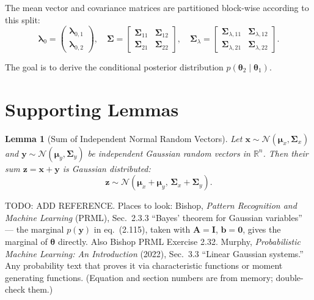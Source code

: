 \documentclass{article}
\newtheorem{lemma}{Lemma}
\begin{document}
The mean vector and covariance matrices are partitioned block-wise according to this split:
\begin{equation}
    \boldsymbol{\lambda}_0 = \begin{pmatrix} \boldsymbol{\lambda}_{0,1} \\ \boldsymbol{\lambda}_{0,2} \end{pmatrix}, \quad
    \boldsymbol{\Sigma} = \begin{bmatrix} \boldsymbol{\Sigma}_{11} & \boldsymbol{\Sigma}_{12} \\ \boldsymbol{\Sigma}_{21} & \boldsymbol{\Sigma}_{22} \end{bmatrix}, \quad
    \boldsymbol{\Sigma}_\lambda = \begin{bmatrix} \boldsymbol{\Sigma}_{\lambda,11} & \boldsymbol{\Sigma}_{\lambda,12} \\ \boldsymbol{\Sigma}_{\lambda,21} & \boldsymbol{\Sigma}_{\lambda,22} \end{bmatrix}.
\end{equation}

The goal is to derive the conditional posterior distribution $p(\boldsymbol{\theta}_2 \mid \boldsymbol{\theta}_1)$.


\section*{Supporting Lemmas}

\begin{lemma}[Sum of Independent Normal Random Vectors]
\label{lem:gaussian_sum}
Let $\mathbf{x} \sim \mathcal{N}(\boldsymbol{\mu}_x, \boldsymbol{\Sigma}_x)$ and $\mathbf{y} \sim \mathcal{N}(\boldsymbol{\mu}_y, \boldsymbol{\Sigma}_y)$ be independent Gaussian random vectors in $\mathbb{R}^n$. Then their sum $\mathbf{z} = \mathbf{x} + \mathbf{y}$ is Gaussian distributed:
\begin{equation}
    \mathbf{z} \sim \mathcal{N}(\boldsymbol{\mu}_x + \boldsymbol{\mu}_y, \, \boldsymbol{\Sigma}_x + \boldsymbol{\Sigma}_y).
\end{equation}
\end{lemma}
TODO: ADD REFERENCE. Places to look: Bishop, \emph{Pattern Recognition and Machine Learning} (PRML), Sec.~2.3.3 ``Bayes' theorem for Gaussian variables'' --- the marginal $p(\mathbf{y})$ in eq.~(2.115), taken with $\mathbf{A} = \mathbf{I}$, $\mathbf{b} = \mathbf{0}$, gives the marginal of $\boldsymbol{\theta}$ directly. Also Bishop PRML Exercise 2.32. Murphy, \emph{Probabilistic Machine Learning: An Introduction} (2022), Sec.~3.3 ``Linear Gaussian systems.'' Any probability text that proves it via characteristic functions or moment generating functions. (Equation and section numbers are from memory; double-check them.)
\end{document}
